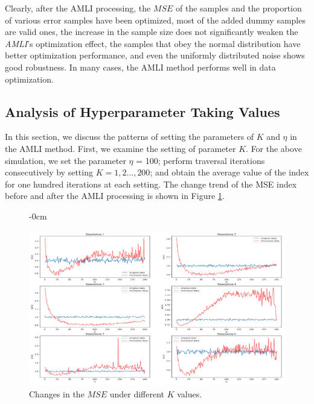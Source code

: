 \documentclass[mathematics,article,accept,pdftex,moreauthors]{Definitions/mdpi}
\begin{document}
Clearly, after the AMLI processing, the $MSE$ of the samples and the proportion of various error samples have been optimized, most of the added dummy samples are valid ones, the increase in the sample size does not significantly weaken the \emph{AMLI}'s optimization effect, the samples that obey the normal distribution have better optimization performance, and even the uniformly distributed noise shows good robustness. In many cases, the AMLI method performs well in data optimization.

\subsection{Analysis of Hyperparameter Taking Values}

 In this section, we discuss the patterns of setting the parameters of $K$ and $\eta$ in the AMLI method. First, we examine the setting of parameter $K$. For the above simulation, we set the parameter $\eta$ = 100; perform traversal iterations consecutively by setting $K = 1, 2\ldots, 200$; and obtain the average value of the index for one hundred iterations at each setting. The change trend of the MSE index before and after the AMLI processing is shown in Figure \ref{fig:2-}.
\vspace{-6pt}

\begin{figure}[H]

\begin{adjustwidth}{-\extralength}{0cm}\centering


	\includegraphics[width=1\linewidth]{"Figures/第二篇论文图/图2 参数K不同取值下MSE变化趋势"}
	\end{adjustwidth}
	\caption{Changes in the $MSE$ under different $K$ values.}
	\label{fig:2-}
\end{figure}
\end{document}
